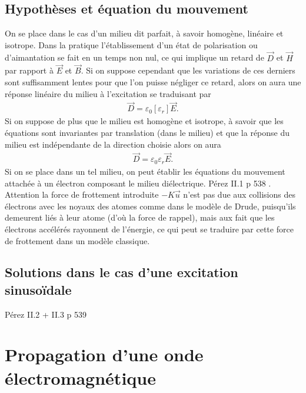 \documentclass[12pt,prb,aps,epsf]{report}
\begin{document}
\subsection{Hypothèses et équation du mouvement}
On se place dans le cas d'un milieu dit parfait, à savoir homogène, linéaire et isotrope. Dans la pratique l'établissement d'un état de polarisation ou d'aimantation se fait en un temps non nul, ce qui implique un retard de $\vec{D}$ et $\vec{H}$ par rapport à $\vec{E}$ et $\vec{B}$. Si on suppose cependant que les variations de ces derniers sont suffisamment lentes pour que l'on puisse négliger ce retard, alors on aura une réponse linéaire du milieu à l'excitation se traduisant par 
\begin{eqnarray}
\vec{D} =  \varepsilon_0 [\varepsilon_r] \vec{E}.
\end{eqnarray}
Si on suppose de plus que le milieu est homogène et isotrope, à savoir que les équations sont invariantes par translation (dans le milieu) et que la réponse du milieu est indépendante de la direction choisie alors on aura 
\begin{eqnarray}
\vec{D} =  \varepsilon_0 \varepsilon_r \vec{E}.
\end{eqnarray}
Si on se place dans un tel milieu, on peut établir les équations du mouvement attachée à un électron composant le milieu diélectrique.
Pérez II.1 p 538 .\\
Attention la force de frottement introduite $-K\vec{u}$ n'est pas due aux collisions des électrons avec les noyaux des atomes comme dans le modèle de Drude, puisqu'ils demeurent liés à leur atome (d'où la force de rappel), mais aux fait que les électrons accélérés rayonnent de l'énergie, ce qui peut se traduire par cette force de frottement dans un modèle classique.
\subsection{Solutions dans le cas d'une excitation sinusoïdale}
Pérez II.2 + II.3 p 539 

\section{Propagation d'une onde électromagnétique}
\end{document}
